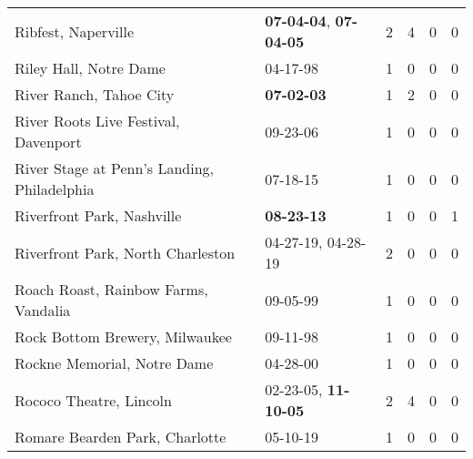 \begin{longtable}{p{}p{}p{}p{}p{}p{}}
                                                          Ribfest, Naperville &  \textbf{07-04-04\textsuperscript{}}, \textbf{07-04-05\textsuperscript{}} &  2 &  4 &  0 &  0 \\
                                                       Riley Hall, Notre Dame &                                                04-17-98\textsuperscript{} &  1 &  0 &  0 &  0 \\
                                                      River Ranch, Tahoe City &                                       \textbf{07-02-03\textsuperscript{}} &  1 &  2 &  0 &  0 \\
                                         River Roots Live Festival, Davenport &                                                09-23-06\textsuperscript{} &  1 &  0 &  0 &  0 \\
                                  River Stage at Penn's Landing, Philadelphia &                                                07-18-15\textsuperscript{} &  1 &  0 &  0 &  0 \\
                                                   Riverfront Park, Nashville &                                       \textbf{08-23-13\textsuperscript{}} &  1 &  0 &  0 &  1 \\
                                            Riverfront Park, North Charleston &                    04-27-19\textsuperscript{}, 04-28-19\textsuperscript{} &  2 &  0 &  0 &  0 \\
                                         Roach Roast, Rainbow Farms, Vandalia &                                                09-05-99\textsuperscript{} &  1 &  0 &  0 &  0 \\
                                               Rock Bottom Brewery, Milwaukee &                                                09-11-98\textsuperscript{} &  1 &  0 &  0 &  0 \\
                                                  Rockne Memorial, Notre Dame &                                                04-28-00\textsuperscript{} &  1 &  0 &  0 &  0 \\
                                                      Rococo Theatre, Lincoln &           02-23-05\textsuperscript{}, \textbf{11-10-05\textsuperscript{}} &  2 &  4 &  0 &  0 \\
                                               Romare Bearden Park, Charlotte &                                                05-10-19\textsuperscript{} &  1 &  0 &  0 &  0 \\

\end{longtable}
